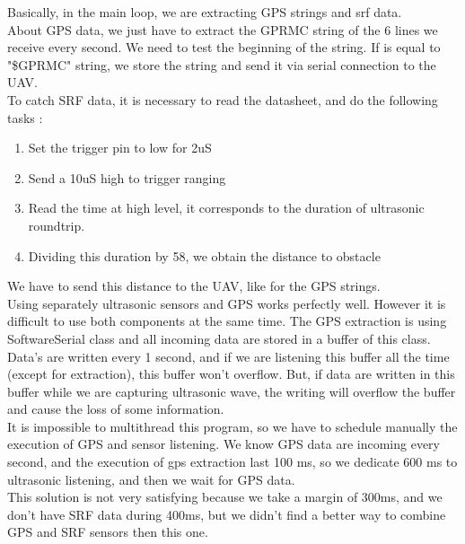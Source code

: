 Basically, in the main loop, we are extracting GPS strings and srf data.\\

About GPS data, we just have to extract the GPRMC string of the 6 lines we receive every second.
We need to test the beginning of the string. If is equal to "\$GPRMC" string, we store the string and send it via 
serial connection to the UAV.\\

To catch SRF data, it is necessary to read the datasheet, and do the following tasks :\\

\begin{enumerate}
\item Set the trigger pin to low for 2uS
\item Send a 10uS high to trigger ranging
\item Read the time at high level, it corresponds to the duration of ultrasonic roundtrip.
\item Dividing this duration by 58, we obtain the distance to obstacle
\end{enumerate}

We have to send this distance to the UAV, like for the GPS strings.\\

Using separately ultrasonic sensors and GPS works perfectly well. However it is difficult to use both components at the same time. The GPS extraction is using SoftwareSerial class and all incoming data are stored in a buffer of this class. Data's are written every 1 second, and if we are listening this buffer all the time (except for extraction), this buffer won't overflow. But, if data are written in this buffer while we are capturing ultrasonic wave, the writing will overflow the buffer and cause the loss of some information.\\

It is impossible to multithread this program, so we have to schedule manually the execution of GPS and sensor listening. We know GPS data are incoming every second, and the execution of gps extraction last 100 ms, so we dedicate 600 ms to ultrasonic listening, and then we wait for GPS data.\\

This solution is not very satisfying because we take a margin of 300ms, and we don't have SRF data during 400ms, but we didn't find a better way to combine GPS and SRF sensors then this one.\\



